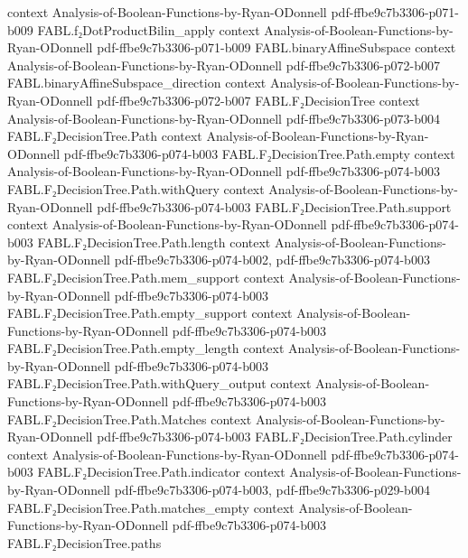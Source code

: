\begin{theorem}
  {context}
  {Analysis-of-Boolean-Functions-by-Ryan-ODonnell}
  {pdf-ffbe9c7b3306-p071-b009}
\proofstep
  {FABL.f₂DotProductBilin_apply}
  {context}
  {Analysis-of-Boolean-Functions-by-Ryan-ODonnell}
  {pdf-ffbe9c7b3306-p071-b009}
\proofstep
  {FABL.binaryAffineSubspace}
  {context}
  {Analysis-of-Boolean-Functions-by-Ryan-ODonnell}
  {pdf-ffbe9c7b3306-p072-b007}
\proofstep
  {FABL.binaryAffineSubspace_direction}
  {context}
  {Analysis-of-Boolean-Functions-by-Ryan-ODonnell}
  {pdf-ffbe9c7b3306-p072-b007}
\proofstep
  {FABL.F₂DecisionTree}
  {context}
  {Analysis-of-Boolean-Functions-by-Ryan-ODonnell}
  {pdf-ffbe9c7b3306-p073-b004}
\proofstep
  {FABL.F₂DecisionTree.Path}
  {context}
  {Analysis-of-Boolean-Functions-by-Ryan-ODonnell}
  {pdf-ffbe9c7b3306-p074-b003}
\proofstep
  {FABL.F₂DecisionTree.Path.empty}
  {context}
  {Analysis-of-Boolean-Functions-by-Ryan-ODonnell}
  {pdf-ffbe9c7b3306-p074-b003}
\proofstep
  {FABL.F₂DecisionTree.Path.withQuery}
  {context}
  {Analysis-of-Boolean-Functions-by-Ryan-ODonnell}
  {pdf-ffbe9c7b3306-p074-b003}
\proofstep
  {FABL.F₂DecisionTree.Path.support}
  {context}
  {Analysis-of-Boolean-Functions-by-Ryan-ODonnell}
  {pdf-ffbe9c7b3306-p074-b003}
\proofstep
  {FABL.F₂DecisionTree.Path.length}
  {context}
  {Analysis-of-Boolean-Functions-by-Ryan-ODonnell}
  {pdf-ffbe9c7b3306-p074-b002,
    pdf-ffbe9c7b3306-p074-b003}
\proofstep
  {FABL.F₂DecisionTree.Path.mem_support}
  {context}
  {Analysis-of-Boolean-Functions-by-Ryan-ODonnell}
  {pdf-ffbe9c7b3306-p074-b003}
\proofstep
  {FABL.F₂DecisionTree.Path.empty_support}
  {context}
  {Analysis-of-Boolean-Functions-by-Ryan-ODonnell}
  {pdf-ffbe9c7b3306-p074-b003}
\proofstep
  {FABL.F₂DecisionTree.Path.empty_length}
  {context}
  {Analysis-of-Boolean-Functions-by-Ryan-ODonnell}
  {pdf-ffbe9c7b3306-p074-b003}
\proofstep
  {FABL.F₂DecisionTree.Path.withQuery_output}
  {context}
  {Analysis-of-Boolean-Functions-by-Ryan-ODonnell}
  {pdf-ffbe9c7b3306-p074-b003}
\proofstep
  {FABL.F₂DecisionTree.Path.Matches}
  {context}
  {Analysis-of-Boolean-Functions-by-Ryan-ODonnell}
  {pdf-ffbe9c7b3306-p074-b003}
\proofstep
  {FABL.F₂DecisionTree.Path.cylinder}
  {context}
  {Analysis-of-Boolean-Functions-by-Ryan-ODonnell}
  {pdf-ffbe9c7b3306-p074-b003}
\proofstep
  {FABL.F₂DecisionTree.Path.indicator}
  {context}
  {Analysis-of-Boolean-Functions-by-Ryan-ODonnell}
  {pdf-ffbe9c7b3306-p074-b003,
    pdf-ffbe9c7b3306-p029-b004}
\proofstep
  {FABL.F₂DecisionTree.Path.matches_empty}
  {context}
  {Analysis-of-Boolean-Functions-by-Ryan-ODonnell}
  {pdf-ffbe9c7b3306-p074-b003}
\proofstep
  {FABL.F₂DecisionTree.paths}

\end{theorem}
